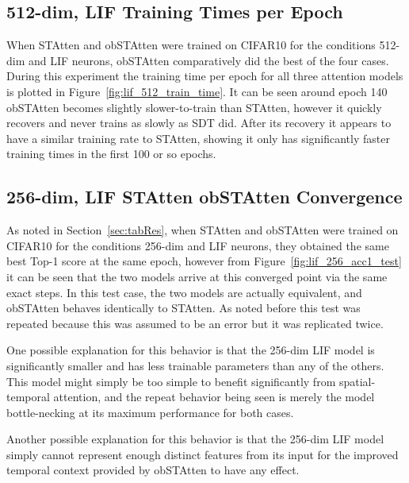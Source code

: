\documentclass[../main.tex]{subfiles}
\begin{document}
\begin{table}[h]\centering
\caption{Dim-512 PLIF Results}
\vspace{-0.75\baselineskip}
\small

\end{table}


\subsection{512-dim, LIF Training Times per Epoch}
When STAtten and obSTAtten were trained on CIFAR10 for the conditions 512-dim and LIF neurons, obSTAtten comparatively did the best of the four cases. During this experiment the training time per epoch for all three attention models is plotted in Figure~\ref{fig:lif_512_train_time}. It can be seen around epoch 140 obSTAtten becomes slightly slower-to-train than STAtten, however it quickly recovers and never trains as slowly as SDT did. After its recovery it appears to have a similar training rate to STAtten, showing it only has significantly faster training times in the first 100 or so epochs.

\subsection{256-dim, LIF STAtten obSTAtten Convergence}
As noted in Section~\ref{sec:tabRes}, when STAtten and obSTAtten were trained on CIFAR10 for the conditions 256-dim and LIF neurons, they obtained the same best Top-1 score at the same epoch, however from Figure~\ref{fig:lif_256_acc1_test} it can be seen that the two models arrive at this converged point via the same exact steps. In this test case, the two models are actually equivalent, and obSTAtten behaves identically to STAtten. As noted before this test was repeated because this was assumed to be an error but it was replicated twice.

\par One possible explanation for this behavior is that the 256-dim LIF model is significantly smaller and has less trainable parameters than any of the others. This model might simply be too simple to benefit significantly from spatial-temporal attention, and the repeat behavior being seen is merely the model bottle-necking at its maximum performance for both cases.

\par Another possible explanation for this behavior is that the 256-dim LIF model simply cannot represent enough distinct features from its input for the improved temporal context provided by obSTAtten to have any effect.
\end{document}
